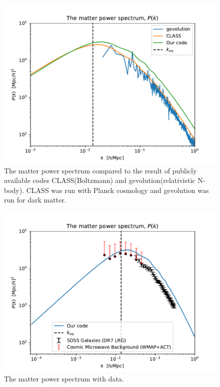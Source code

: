 \documentclass{aa}
\begin{document}
\begin{figure}[H]
   \includegraphics[scale=0.6]{../figures/milestone4/matter_PS.pdf}
   \caption{The matter power spectrum compared to the result of publicly available codes CLASS(Boltzmann) and gevolution(relativistic N-body). CLASS was run with Planck cosmology and gevolution was run for dark matter.}\label{fig:m4_matter_PS}
\end{figure}

\begin{figure}[H]
   \includegraphics[scale=0.6]{../figures/milestone4/matter_PS_data.pdf}
   \caption{The matter power spectrum with data.}\label{fig:m4_matter_PS_data}
\end{figure}
\end{document}
